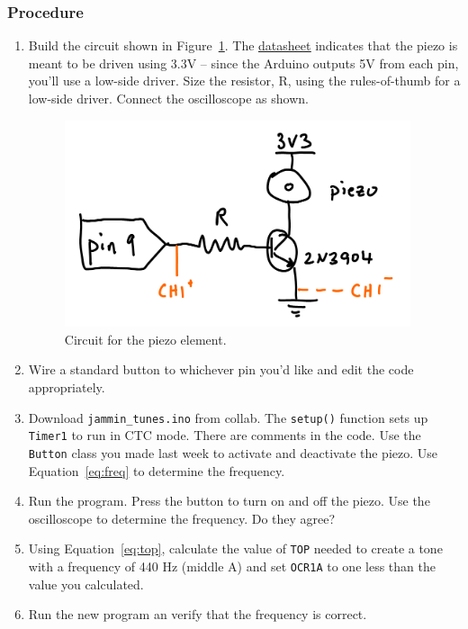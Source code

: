 \documentclass[11pt]{article} %
\begin{document}
\subsubsection*{Procedure}
\begin{enumerate}
\item Build the circuit shown in Figure~\ref{fig:piezo}. The \href{http://cdn.sparkfun.com/datasheets/Components/General/cem-1203-42-.pdf}{\underline{datasheet}} indicates that the piezo is meant to be driven using 3.3V -- since the Arduino outputs 5V from each pin, you’ll use a low-side driver. Size the resistor, R, using the rules-of-thumb for a low-side driver. Connect the oscilloscope as shown.

\begin{figure}[htbp]
\begin{center}
\includegraphics[width=4in]{figures/piezo}
\caption{Circuit for the piezo element.}
\label{fig:piezo}
\end{center}
\end{figure}

\item Wire a standard button to whichever pin you’d like and edit the code appropriately.
\item Download \verb|jammin_tunes.ino| from collab. The \verb|setup()| function sets up \verb|Timer1| to run in CTC mode. There are comments in the code. Use the \verb|Button| class you made last week to activate and deactivate the piezo. Use Equation~\ref{eq:freq} to determine the frequency.
\item Run the program. Press the button to turn on and off the piezo. Use the oscilloscope to determine the frequency. Do they agree?
\item Using Equation~\ref{eq:top}, calculate the value of \verb|TOP| needed to create a tone with a frequency of 440 Hz (middle A) and set \verb|OCR1A| to one less than the value you calculated.
\item Run the new program an verify that the frequency is correct.
\end{enumerate}
\end{document}

